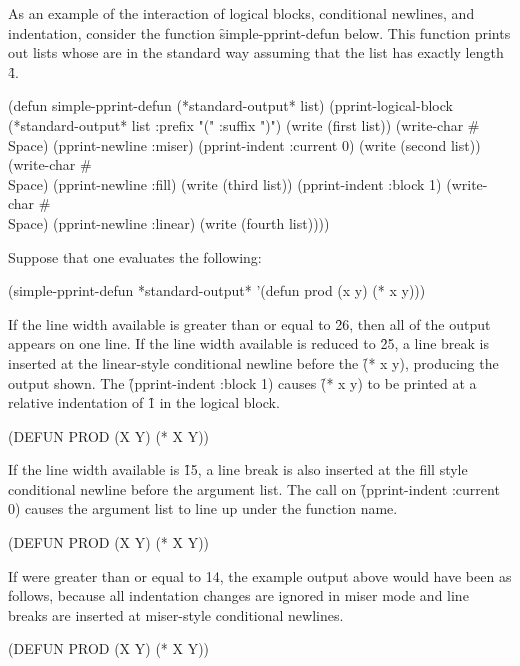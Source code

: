 
As an example of the interaction of logical blocks, conditional newlines,
and indentation, consider the function \f{simple-pprint-defun} below.  This
function prints out lists whose  are  in the 
standard way assuming that the list has exactly length \f{4}.
 
\code
(defun simple-pprint-defun (*standard-output* list)
  (pprint-logical-block (*standard-output* list :prefix "(" :suffix ")")
    (write (first list))
    (write-char #\\Space)
    (pprint-newline :miser)
    (pprint-indent :current 0)
    (write (second list))
    (write-char #\\Space)
    (pprint-newline :fill)
    (write (third list))
    (pprint-indent :block 1)
    (write-char #\\Space)
    (pprint-newline :linear)
    (write (fourth list))))
\endcode

Suppose that one evaluates the following:

\code
(simple-pprint-defun *standard-output* '(defun prod (x y) (* x y)))
\endcode
 
If the line width available is greater than or equal to \f{26}, then all of the
output appears on one line.  If the line width available is reduced to \f{25},
a line break is inserted at the 
linear-style conditional newline
before the
 \f{(* x y)}, producing the output shown.  The
\f{(pprint-indent :block 1)} causes \f{(* x y)} to be printed at a relative
indentation of \f{1} in the logical block.
 
\code
 (DEFUN PROD (X Y) 
   (* X Y))
\endcode 

If the line width available is \f{15}, a line break is also inserted at the
fill style conditional newline before the argument list.  The call on
\f{(pprint-indent :current 0)} causes the argument list to line up under the
function name.
 
\code
(DEFUN PROD
       (X Y)
  (* X Y))
\endcode
 
If  were greater than or equal to 14, the example 
output above would have been as follows, because all indentation changes 
are ignored in miser mode and line breaks are inserted at 
miser-style conditional newlines.
 
\code
 (DEFUN
  PROD
  (X Y)
  (* X Y))
\endcode 

